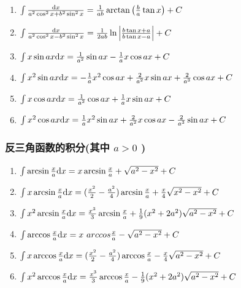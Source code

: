 \begin{footnotesize}
\begin{enumerate}
\item $ \int \frac{\mathrm{d} x}{a^2\cos^2x+b^2\sin^2x} = \frac{1}{ab} \arctan\left( \frac{b}{a}\tan x \right) + C $

\item $ \int \frac{\mathrm{d} x}{a^2\cos^2x-b^2\sin^2x} = \frac{1}{2ab}\ln\left|\frac{b\tan x+a}{b\tan x-a}\right| + C $

\item $ \int x \sin ax \mathrm{d} x = \frac{1}{a^2} \sin ax - \frac{1}{a} x \cos ax + C $

\item $ \int x^2 \sin ax \mathrm{d} x = -\frac{1}{a} x^2 \cos ax + \frac{2}{a^2} x \sin ax + \frac{2}{a^3} \cos ax + C$

\item $ \int x \cos ax \mathrm{d} x = \frac{1}{a^2} \cos ax + \frac{1}{a} x \sin ax + C $

\item $ \int x^2 \cos ax \mathrm{d} x = \frac{1}{a} x^2 \sin ax + \frac{2}{a^2} x \cos ax - \frac{2}{a^3} \sin ax + C $

\end{enumerate}

\subsubsection*{反三角函数的积分(其中 $a>0$ )}

\begin {enumerate}

\item $ \int \arcsin \frac{x}{a} \mathrm{d} x = x \arcsin \frac{x}{a} + \sqrt{a^2-x^2}+C $

\item $ \int x \arcsin \frac{x}{a} \mathrm{d} x= (\frac{x^2}{2}-\frac{a^2}{4})\arcsin \frac{x}{a} + \frac{x}{4} \sqrt{x^2-x^2}+C$

\item $ \int x^2 \arcsin \frac{x}{a} \mathrm{d} x = \frac{x^3}{3}\arcsin \frac{x}{a}+\frac{1}{9}(x^2+2 a^2)\sqrt{a^2-x^2}+C $

\item $ \int \arccos \frac{x}{a} \md x= x \ arccos \frac{x}{a} - \sqrt{a^2-x^2} +C $

\item $ \int x \arccos \frac{x}{a} \mathrm{d} x= (\frac{x^2}{2}-\frac{a^2}{4})\arccos \frac{x}{a} - \frac{x}{4} \sqrt{a^2-x^2}+C $

\item $ \int x^2 \arccos \frac{x}{a}\mathrm{d} x= \frac{x^3}{3}\arccos \frac{x}{a} - \frac{1}{9}(x^2+2a^2)\sqrt{a^2-x^2}+C$


\end{enumerate}
\end{footnotesize}
